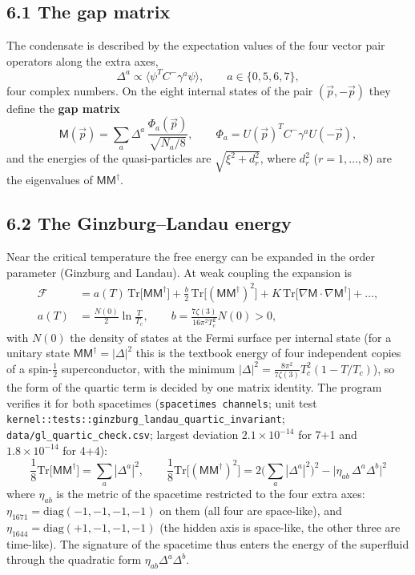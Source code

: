 \documentclass[
  10pt,
]{article}
\begin{document}
\hypertarget{the-gap-matrix}{%
\subsection{6.1 The gap matrix}\label{the-gap-matrix}}

The condensate is described by the expectation values of the four vector
pair operators along the extra axes,
\[\Delta^a\propto\big\langle\psi^TC^{-}\gamma^a\psi\big\rangle,\qquad a\in\{0,5,6,7\},\]
four complex numbers. On the eight internal states of the pair
\((\vec p,-\vec p)\) they define the \textbf{gap matrix}
\[\mathsf M(\vec p)=\sum_{a}\Delta^a\,\frac{\Phi_a(\vec p)}{\sqrt{N_a/8}},\qquad\Phi_a=U(\vec p)^TC^{-}\gamma^aU(-\vec p),\tag{6.1}\]
and the energies of the quasi-particles are \(\sqrt{\xi^2+d_r^2}\),
where \(d_r^2\) (\(r=1,\dots,8\)) are the eigenvalues of
\(\mathsf M\mathsf M^\dagger\).

\hypertarget{the-ginzburglandau-energy}{%
\subsection{6.2 The Ginzburg--Landau
energy}\label{the-ginzburglandau-energy}}

Near the critical temperature the free energy can be expanded in the
order parameter (Ginzburg and Landau). At weak coupling the expansion is
\[\begin{aligned}\mathcal F&=a(T)\,\mathrm{Tr}\big[\mathsf M\mathsf M^\dagger\big]+\frac b2\,\mathrm{Tr}\big[(\mathsf M\mathsf M^\dagger)^2\big]+K\,\mathrm{Tr}\big[\nabla\mathsf M\cdot\nabla\mathsf M^\dagger\big]+\dots,\\
a(T)&=\frac{N(0)}2\ln\frac{T}{T_c},\qquad b=\frac{7\zeta(3)}{16\pi^2T_c^2}N(0)>0,\end{aligned}\]
with \(N(0)\) the density of states at the Fermi surface per internal
state (for a unitary state \(\mathsf M\mathsf M^\dagger=|\Delta|^2\)
this is the textbook energy of four independent copies of a
spin-\(\tfrac12\) superconductor, with the minimum
\(|\Delta|^2=\frac{8\pi^2}{7\zeta(3)}T_c^2(1-T/T_c)\)), so the form of
the quartic term is decided by one matrix identity. The program verifies
it for both spacetimes (\texttt{spacetimes\ channels}; unit test
\texttt{kernel::tests::ginzburg\_landau\_quartic\_invariant};
\texttt{data/gl\_quartic\_check.csv}; largest deviation
\(2.1\times10^{-14}\) for 7+1 and \(1.8\times10^{-14}\) for 4+4):
\[\boxed{\;\frac18\mathrm{Tr}\big[\mathsf M\mathsf M^\dagger\big]=\sum_a|\Delta^a|^2,\qquad
\frac18\mathrm{Tr}\big[(\mathsf M\mathsf M^\dagger)^2\big]=2\Big(\sum_a|\Delta^a|^2\Big)^2-\big|\eta_{ab}\,\Delta^a\Delta^b\big|^2\;}\tag{6.2}\]
where \(\eta_{ab}\) is the metric of the spacetime restricted to the
four extra axes: \(\eta_{1671}=\mathrm{diag}(-1,-1,-1,-1)\) on them (all
four are space-like), and \(\eta_{1644}=\mathrm{diag}(+1,-1,-1,-1)\)
(the hidden axis is space-like, the other three are time-like). The
signature of the spacetime thus enters the energy of the superfluid
through the quadratic form \(\eta_{ab}\Delta^a\Delta^b\).
\end{document}
